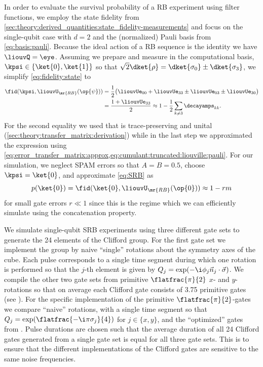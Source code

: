 In order to evaluate the survival probability of a RB experiment using filter functions, we employ the state fidelity from \cref{sec:theory:derived_quantities:state_fidelity-measurements} and focus on the single-qubit case with $d = 2$ and the (normalized) Pauli basis from \cref{eq:basis:pauli}. Because the ideal action of a RB sequence is the identity we have $\liouvQ = \eye$. Assuming we prepare and measure in the computational basis, $\kpsi\in\lbrace\ket{0}, \ket{1}\rbrace$ so that $\sqrt{2}\dket{\rho} = \dket{\sigma_0}\pm\dket{\sigma_3}$, we simplify \cref{eq:fidelity:state} to
\begin{equation}\label{eq:fidelity:state:RB}
    \begin{split}
        \fid(\kpsi, \liouvU_\mr{RB}(\op{\psi})) &= \frac{1}{2}\bigl(\liouvUe_{00} +
                                                                \liouvUe_{33}\pm
                                                                \liouvUe_{03}\pm
                                                                \liouvUe_{30}\bigr) \\
                                                &= \frac{1 + \liouvUe_{33}}{2} \approx 1 - \frac{1}{2}\sum_{k\neq 3}\decayamps_{kk}.
    \end{split}
\end{equation}
For the second equality we used that \liouvUe is trace-preserving and unital (\cf \cref{sec:theory:transfer_matrix:derivation}) while in the last step we approximated the expression using \cref{eq:error_transfer_matrix:approx,eq:cumulant:truncated:liouville:pauli}. For our simulation, we neglect SPAM errors so that $A =  B =  0.5$, choose $\kpsi = \ket{0}$, and approximate \cref{eq:SRB} as
\begin{equation}\label{eq:fidelity:state:RB:fit}
    p(\ket{0}) = \fid(\ket{0}, \liouvU_\mr{RB}(\op{0}))\approx 1 - rm
\end{equation}
for small gate errors $r\ll 1$ since this is the regime which we can efficiently simulate using the concatenation property.

We simulate single-qubit SRB experiments using three different gate sets to generate the 24 elements of the Clifford group. For the first gate set we implement the group by naive \enquote{single} rotations about the symmetry axes of the cube. Each pulse corresponds to a single time segment during which one rotation is performed so that the $j$-th element is given by $Q_j = \exp(-\i\phi_j\vec{n}_j\cdot\vec{\sigma})$. We compile the other two gate sets from primitive $\flatfrac{\pi}{2}$ $x$- and $y$-rotations so that on average each Clifford gate consists of \num{3.75} primitive gates (see ). For the specific implementation of the primitive $\flatfrac{\pi}{2}$-gates we compare \enquote{naive} rotations, \ie with a single time segment so that $Q_j = \exp(\flatfrac{-\i\pi\sigma_j}{4})$ for $j\in\lbrace x, y\rbrace$, and the \enquote{optimized} gates from . Pulse durations are chosen such that the average duration of all 24 Clifford gates generated from a single gate set is equal for all three gate sets. This is to ensure that the different implementations of the Clifford gates are sensitive to the same noise frequencies.

